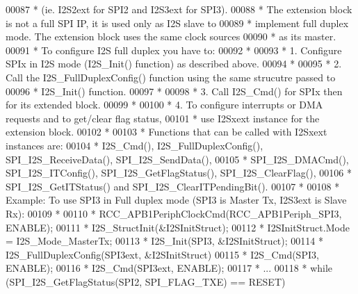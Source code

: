 \begin{DoxyCode}
00087 \textcolor{comment}{  *          (ie. I2S2ext for SPI2 and I2S3ext for SPI3).}
00088 \textcolor{comment}{  *          The extension block is not a full SPI IP, it is used only as I2S slave to}
00089 \textcolor{comment}{  *          implement full duplex mode. The extension block uses the same clock sources}
00090 \textcolor{comment}{  *          as its master.          }
00091 \textcolor{comment}{  *          To configure I2S full duplex you have to:}
00092 \textcolor{comment}{  *            }
00093 \textcolor{comment}{  *          1. Configure SPIx in I2S mode (I2S\_Init() function) as described above. }
00094 \textcolor{comment}{  *           }
00095 \textcolor{comment}{  *          2. Call the I2S\_FullDuplexConfig() function using the same strucutre passed to  }
00096 \textcolor{comment}{  *             I2S\_Init() function.}
00097 \textcolor{comment}{  *            }
00098 \textcolor{comment}{  *          3. Call I2S\_Cmd() for SPIx then for its extended block.}
00099 \textcolor{comment}{  *          }
00100 \textcolor{comment}{  *          4. To configure interrupts or DMA requests and to get/clear flag status, }
00101 \textcolor{comment}{  *             use I2Sxext instance for the extension block.}
00102 \textcolor{comment}{  *             }
00103 \textcolor{comment}{  *          Functions that can be called with I2Sxext instances are:}
00104 \textcolor{comment}{  *          I2S\_Cmd(), I2S\_FullDuplexConfig(), SPI\_I2S\_ReceiveData(), SPI\_I2S\_SendData(), }
00105 \textcolor{comment}{  *          SPI\_I2S\_DMACmd(), SPI\_I2S\_ITConfig(), SPI\_I2S\_GetFlagStatus(), SPI\_I2S\_ClearFlag(),}
00106 \textcolor{comment}{  *          SPI\_I2S\_GetITStatus() and SPI\_I2S\_ClearITPendingBit().}
00107 \textcolor{comment}{  *                 }
00108 \textcolor{comment}{  *          Example: To use SPI3 in Full duplex mode (SPI3 is Master Tx, I2S3ext is Slave Rx):}
00109 \textcolor{comment}{  *            }
00110 \textcolor{comment}{  *          RCC\_APB1PeriphClockCmd(RCC\_APB1Periph\_SPI3, ENABLE);   }
00111 \textcolor{comment}{  *          I2S\_StructInit(&I2SInitStruct);}
00112 \textcolor{comment}{  *          I2SInitStruct.Mode = I2S\_Mode\_MasterTx;     }
00113 \textcolor{comment}{  *          I2S\_Init(SPI3, &I2SInitStruct);}
00114 \textcolor{comment}{  *          I2S\_FullDuplexConfig(SPI3ext, &I2SInitStruct)}
00115 \textcolor{comment}{  *          I2S\_Cmd(SPI3, ENABLE);}
00116 \textcolor{comment}{  *          I2S\_Cmd(SPI3ext, ENABLE);}
00117 \textcolor{comment}{  *          ...}
00118 \textcolor{comment}{  *          while (SPI\_I2S\_GetFlagStatus(SPI2, SPI\_FLAG\_TXE) == RESET)}

\end{DoxyCode}
